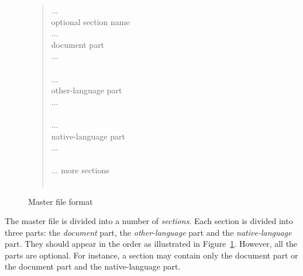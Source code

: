 \begin{figure}
\begin{center}
\begin{boxedminipage}{5in}
\it
\begin{quote}
 \vspace*{12pt}
\hspace*{1.5em} ... \\
 optional section name \\
\hspace*{1.5em} ... \\
\hspace*{1.5em} document part \\
\hspace*{1.5em} ... \\
 \\
\hspace*{1.5em} ... \\
\hspace*{1.5em} other-language part \\
\hspace*{1.5em} ... \\
 \\
\hspace*{1.5em} ... \\
\hspace*{1.5em} native-language part \\
\hspace*{1.5em} ... \\
 \\
\hspace*{1.5em} ... more sections\\
 \\
\end{quote}
\end{boxedminipage}
\end{center}
\caption{Master file format\label{fig-input-format}}
\end{figure}
The master file is divided into a number of {\it sections\/}. Each
section is divided into three parts: the {\it document} part, the {\it
other-language} part and the {\it native-language} part. They should
appear in the order as illustrated in Figure~\ref{fig-input-format}.
However, all the parts  
are optional. For instance, a section may contain only the document
part or the document part and the native-language part.

